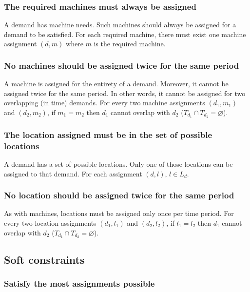 \documentclass[../thesis.tex]{subfiles}
\begin{document}
\subsubsection{The required machines must always be assigned}

A demand has machine needs. Such machines should always be assigned 
for a demand to be satisfied.
For each required machine, there must exist one machine assignment $(d, m)$ where $m$ is the required machine.


\subsubsection{No machines should be assigned twice for the same period}

A machine is assigned for the entirety of a demand. Moreover, it cannot be assigned twice 
for the same period. In other words, it cannot be assigned for two overlapping (in time) demands.
For every two machine assignments $(d_1, m_1)$ and $(d_2, m_2)$, if $m_1 = m_2$ then $d_1$ cannot overlap with $d_2$
($T_{d_1} \cap T_{d_2} = \varnothing $).


\subsubsection{The location assigned must be in the set of possible locations}

A demand has a set of possible locations. Only one of those locations can be assigned 
to that demand.
For each assignment $(d, l)$, $l \in L_d$.

\subsubsection{No location should be assigned twice for the same period}

As with machines, locations must be assigned only once per time period.
For every two location assignments $(d_1, l_1)$ and $(d_2, l_2)$, if $l_1 = l_2$ then $d_1$ cannot overlap with $d_2$
($T_{d_1} \cap T_{d_2} = \varnothing $).


\subsection{Soft constraints}

\subsubsection{Satisfy the most assignments possible}
\end{document}
